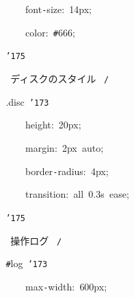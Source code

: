 \documentclass[a4paper,10pt]{article}
\def\mc{\relax}
\begin{document}
\noindent
\mbox{}{\tt\mc \ }{\tt\mc \ }{\tt\mc \ }{\tt\mc \ }{\tt\mc \ }{\tt\mc \ }{\tt\mc \ }{\tt\mc \ }{\tt\mc \ }{\tt\mc \ }{\tt\mc \ }{\tt\mc \ }font{\tt -}size:{\tt\mc \ }14px;

\noindent
\mbox{}{\tt\mc \ }{\tt\mc \ }{\tt\mc \ }{\tt\mc \ }{\tt\mc \ }{\tt\mc \ }{\tt\mc \ }{\tt\mc \ }{\tt\mc \ }{\tt\mc \ }{\tt\mc \ }{\tt\mc \ }color:{\tt\mc \ }{\tt\#}666;

\noindent
\mbox{}{\tt\mc \ }{\tt\mc \ }{\tt\mc \ }{\tt\mc \ }{\tt\mc \ }{\tt\mc \ }{\tt\mc \ }{\tt\mc \ }{\tt\char'175}

\noindent
\mbox{}{\tt\mc \ }{\tt\mc \ }{\tt\mc \ }{\tt\mc \ }{\tt\mc \ }{\tt\mc \ }{\tt\mc \ }{\tt\mc \ }\rm\mc {\tt /}{\tt *}\  ディスクのスタイル \rm\mc \ {\tt *}{\tt /}
\tt\mc 

\noindent
\mbox{}{\tt\mc \ }{\tt\mc \ }{\tt\mc \ }{\tt\mc \ }{\tt\mc \ }{\tt\mc \ }{\tt\mc \ }{\tt\mc \ }.disc{\tt\mc \ }{\tt\char'173}

\noindent
\mbox{}{\tt\mc \ }{\tt\mc \ }{\tt\mc \ }{\tt\mc \ }{\tt\mc \ }{\tt\mc \ }{\tt\mc \ }{\tt\mc \ }{\tt\mc \ }{\tt\mc \ }{\tt\mc \ }{\tt\mc \ }height:{\tt\mc \ }20px;

\noindent
\mbox{}{\tt\mc \ }{\tt\mc \ }{\tt\mc \ }{\tt\mc \ }{\tt\mc \ }{\tt\mc \ }{\tt\mc \ }{\tt\mc \ }{\tt\mc \ }{\tt\mc \ }{\tt\mc \ }{\tt\mc \ }margin:{\tt\mc \ }2px{\tt\mc \ }auto;

\noindent
\mbox{}{\tt\mc \ }{\tt\mc \ }{\tt\mc \ }{\tt\mc \ }{\tt\mc \ }{\tt\mc \ }{\tt\mc \ }{\tt\mc \ }{\tt\mc \ }{\tt\mc \ }{\tt\mc \ }{\tt\mc \ }border{\tt -}radius:{\tt\mc \ }4px;

\noindent
\mbox{}{\tt\mc \ }{\tt\mc \ }{\tt\mc \ }{\tt\mc \ }{\tt\mc \ }{\tt\mc \ }{\tt\mc \ }{\tt\mc \ }{\tt\mc \ }{\tt\mc \ }{\tt\mc \ }{\tt\mc \ }transition:{\tt\mc \ }all{\tt\mc \ }0.3s{\tt\mc \ }ease;

\noindent
\mbox{}{\tt\mc \ }{\tt\mc \ }{\tt\mc \ }{\tt\mc \ }{\tt\mc \ }{\tt\mc \ }{\tt\mc \ }{\tt\mc \ }{\tt\char'175}

\noindent
\mbox{}{\tt\mc \ }{\tt\mc \ }{\tt\mc \ }{\tt\mc \ }{\tt\mc \ }{\tt\mc \ }{\tt\mc \ }{\tt\mc \ }\rm\mc {\tt /}{\tt *}\  操作ログ \rm\mc \ {\tt *}{\tt /}
\tt\mc 

\noindent
\mbox{}{\tt\mc \ }{\tt\mc \ }{\tt\mc \ }{\tt\mc \ }{\tt\mc \ }{\tt\mc \ }{\tt\mc \ }{\tt\mc \ }{\tt\#}log{\tt\mc \ }{\tt\char'173}

\noindent
\mbox{}{\tt\mc \ }{\tt\mc \ }{\tt\mc \ }{\tt\mc \ }{\tt\mc \ }{\tt\mc \ }{\tt\mc \ }{\tt\mc \ }{\tt\mc \ }{\tt\mc \ }{\tt\mc \ }{\tt\mc \ }max{\tt -}width:{\tt\mc \ }600px;
\end{document}
